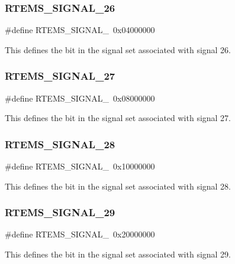 \subsubsection{\texorpdfstring{RTEMS\_SIGNAL\_26}{RTEMS\_SIGNAL\_26}}
{\footnotesize\ttfamily \#define R\+T\+E\+M\+S\+\_\+\+S\+I\+G\+N\+A\+L\+\_~0x04000000}

This defines the bit in the signal set associated with signal 26. \mbox{\label{group__ClassicASR_ga2a481a94ae613d313149e5735ecf8191}} 
\subsubsection{\texorpdfstring{RTEMS\_SIGNAL\_27}{RTEMS\_SIGNAL\_27}}
{\footnotesize\ttfamily \#define R\+T\+E\+M\+S\+\_\+\+S\+I\+G\+N\+A\+L\+\_~0x08000000}

This defines the bit in the signal set associated with signal 27. \mbox{\label{group__ClassicASR_gaa2b42b3a13a6eab82bf035ef2f7a5c5d}} 
\subsubsection{\texorpdfstring{RTEMS\_SIGNAL\_28}{RTEMS\_SIGNAL\_28}}
{\footnotesize\ttfamily \#define R\+T\+E\+M\+S\+\_\+\+S\+I\+G\+N\+A\+L\+\_~0x10000000}

This defines the bit in the signal set associated with signal 28. \mbox{\label{group__ClassicASR_gad3446aa558b1c2ba7f2256769f1d1dc1}} 
\subsubsection{\texorpdfstring{RTEMS\_SIGNAL\_29}{RTEMS\_SIGNAL\_29}}
{\footnotesize\ttfamily \#define R\+T\+E\+M\+S\+\_\+\+S\+I\+G\+N\+A\+L\+\_~0x20000000}

This defines the bit in the signal set associated with signal 29. \mbox{\label{group__ClassicASR_ga0ec2e7b9be7e0f883aa1824e7cd63abd}} 
